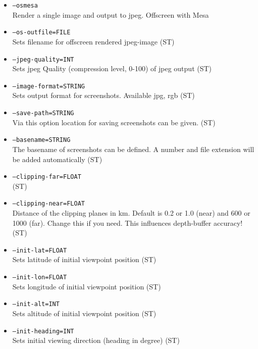 \begin{itemize}
\item \texttt{--osmesa} \\
Render a single image and output to jpeg. Offscreen with Mesa

\item \texttt{--os-outfile=FILE} \\
Sets filename for offscreen rendered jpeg-image (ST)

\item \texttt{--jpeg-quality=INT} \\
Sets jpeg Quality (compression level, 0-100) of jpeg output (ST)

\item \texttt{--image-format=STRING} \\
Sets output format for screenshots. Available jpg, rgb (ST)

\item \texttt{--save-path=STRING}\\
Via this option location for saving screenshots can be given. (ST)

\item \texttt{--basename=STRING}\\
The basename of screenshots can be defined. A number and file extension will be added automatically (ST)

\item \texttt{--clipping-far=FLOAT}\\ (ST)
\item \texttt{--clipping-near=FLOAT}\\
Distance of the clipping planes in km. Default is 0.2 or 1.0 (near) and 600 or 1000 (far). Change this if you need.
This influences depth-buffer accuracy! (ST)

\item \texttt{--init-lat=FLOAT} \\
Sets latitude of initial viewpoint position (ST)

\item \texttt{--init-lon=FLOAT} \\
Sets longitude of initial viewpoint position (ST)

\item \texttt{--init-alt=INT } \\
Sets altitude of initial viewpoint position (ST)

\item \texttt{--init-heading=INT } \\
Sets initial viewing direction (heading in degree) (ST)


\end{itemize}
